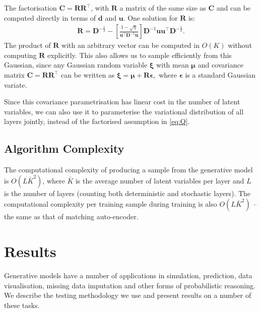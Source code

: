 \documentclass{article}
\newcommand{\myvec}[1]{\mbox{$\mathbf{#1}$}}
\newcommand{\myvecsym}[1]{\mbox{$\boldsymbol{#1}$}}
\newcommand{\vepsilon}{\mbox{$\myvecsym{\epsilon}$}}
\newcommand{\vmu}{\mbox{$\myvecsym{\mu}$}}
\newcommand{\vxi}{\mbox{$\myvecsym{\xi}$}}
\newcommand{\vd}{\mbox{$\myvec{d}$}}
\newcommand{\vu}{\mbox{$\myvec{u}$}}
\newcommand{\vC}{\mbox{$\myvec{C}$}}
\newcommand{\vD}{\mbox{$\myvec{D}$}}
\newcommand{\vR}{\mbox{$\myvec{R}$}}
\begin{document}
\begin{bibunit}[icml2013]
The factorisation $\vC = \vR \vR^\top$, with $\vR$ a matrix of the same size as 
$\vC$ and can be computed directly in terms of $\vd$ and $\vu$. One solution for $\vR$ is:
\begin{align}
\vR = \vD^{ -\frac{1}{2} } - \left[ \frac{1 - \sqrt{\eta}}{\vu^\top \vD^{-1} 
\vu} \right] \vD^{-1} \vu \vu^\top \vD^{ -\frac{1}{2} }.
\label{eq:R}
\end{align}
The product of $\vR$ with an arbitrary vector can be 
computed in $O(K)$ without computing $\vR$ explicitly. This also
allows 
us to sample efficiently from this Gaussian, since any Gaussian 
random variable $\vxi$ with mean $\vmu$ and covariance matrix $\vC = 
\vR \vR^\top$ can be written as
$\vxi = \vmu + \vR \vepsilon, \label{eq:XiR}$
where $\vepsilon$ is a standard Gaussian variate. 

Since this covariance parametrisation has linear cost in the number of latent 
variables, we can also use it to 
parameterise the variational distribution of all layers jointly, instead of the 
factorised assumption in \eqref{eq:Q}. 

\subsection{Algorithm Complexity}
\label{sec:learning_algo}

The computational complexity of producing a sample from the 
generative model is $O(L\bar{K}^2)$,  where 
$\bar{K}$ is the average number of latent variables per layer and $L$ is the 
number of layers (counting both deterministic and stochastic layers). The computational 
complexity per training sample during training is also $O(L\bar{K}^2)$ --  the same as that of matching  auto-encoder.
\vspace{-3mm}
\section{Results}
\label{sec:Results}
Generative models have a number of applications in simulation, prediction, 
data visualisation, missing data imputation and other forms of probabilistic 
reasoning. We describe the testing methodology we use and present results 
on a number of these tasks. 
\vspace{-2mm}


\end{bibunit}
\end{document}
